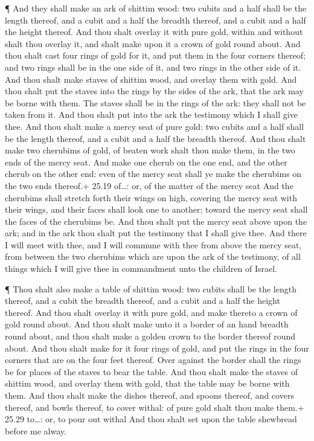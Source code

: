  ¶ And they shall make an ark of shittim wood: two cubits
and a half shall be the length thereof, and a cubit and a half the
breadth thereof, and a cubit and a half the height thereof.
 And thou shalt overlay it with pure gold, within and
without shalt thou overlay it, and shalt make upon it a crown of gold
round about.  And thou shalt cast four rings of gold for
it, and put them in the four corners thereof; and two rings shall be in
the one side of it, and two rings in the other side of it. 
And thou shalt make staves of shittim wood, and overlay them with gold.
 And thou shalt put the staves into the rings by the sides
of the ark, that the ark may be borne with them.  The
staves shall be in the rings of the ark: they shall not be taken from
it.  And thou shalt put into the ark the testimony which I
shall give thee.  And thou shalt make a mercy seat of pure
gold: two cubits and a half shall be the length thereof, and a cubit and
a half the breadth thereof.  And thou shalt make two
cherubims of gold, of beaten work shalt thou make them, in the two ends
of the mercy seat.  And make one cherub on the one end, and
the other cherub on the other end: even of the mercy seat shall ye make
the cherubims on the two ends thereof.+ 25.19 of\ldots: or, of the
matter of the mercy seat  And the cherubims shall stretch
forth their wings on high, covering the mercy seat with their wings, and
their faces shall look one to another; toward the mercy seat shall the
faces of the cherubims be.  And thou shalt put the mercy
seat above upon the ark; and in the ark thou shalt put the testimony
that I shall give thee.  And there I will meet with thee,
and I will commune with thee from above the mercy seat, from between the
two cherubims which are upon the ark of the testimony, of all things
which I will give thee in commandment unto the children of Israel.

 ¶ Thou shalt also make a table of shittim wood: two cubits
shall be the length thereof, and a cubit the breadth thereof, and a
cubit and a half the height thereof.  And thou shalt
overlay it with pure gold, and make thereto a crown of gold round about.
 And thou shalt make unto it a border of an hand breadth
round about, and thou shalt make a golden crown to the border thereof
round about.  And thou shalt make for it four rings of
gold, and put the rings in the four corners that are on the four feet
thereof.  Over against the border shall the rings be for
places of the staves to bear the table.  And thou shalt
make the staves of shittim wood, and overlay them with gold, that the
table may be borne with them.  And thou shalt make the
dishes thereof, and spoons thereof, and covers thereof, and bowls
thereof, to cover withal: of pure gold shalt thou make them.+ 25.29
to\ldots: or, to pour out withal  And thou shalt set upon
the table shewbread before me alway.

